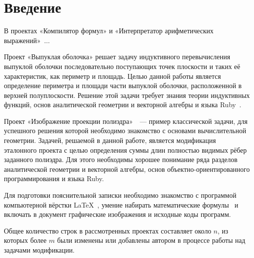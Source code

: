 \section{Введение}

В проектах «Компилятор формул» и «Интерпретатор арифметических
выражений»~$\ldots$

Проект «Выпуклая оболочка»\cite{convex} решает задачу индуктивного 
перевычисления 
выпуклой оболочки последовательно поступающих точек плоскости и таких её
характеристик, как периметр и площадь. Целью данной работы является
определение периметра и площади части выпуклой оболочки, расположенной
в верхней полуплоскости. Решение этой задачи требует знания теории индуктивных
функций, основ аналитической геометрии и векторной алгебры
и языка Ruby~\cite{ruby}.

Проект «Изображение проекции полиэдра»~\cite{polyedr}~--- пример
классической задачи, для успешного решения которой необходимо знакомство с
основами вычислительной геометрии. Задачей, решаемой в данной работе, является
модификация эталонного проекта с целью определения суммы длин полностью видимых
рёбер заданного полиэдра. Для этого необходимы хорошее понимание ряда разделов 
аналитической геометрии и векторной алгебры, основ объектно-ориентированного
программирования и языка Ruby. 
  
Для подготовки пояснительной записки необходимо знакомство с программой
компьютерной вёрстки \LaTeX~\cite{rlatex}, умение набирать математические 
формулы~\cite{texbook} и включать в документ графические изображения и исходные
коды программ.

Общее количество строк в рассмотренных проектах составляет около $n$, из которых
более $m$ были изменены или добавлены автором в процессе работы
над задачами модификации.

